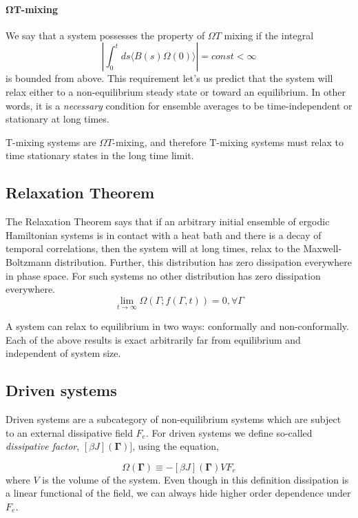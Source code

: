 \documentclass[a4paper,12pt,nofootinbib]{article}
\begin{document}
\paragraph{$\bm{\Omega T}$-mixing}
We say that a system possesses the property of $\Omega T$ mixing if the integral
\begin{equation}
    \left| \int_0^t ds \langle B(s) \Omega(0) \rangle \right| = const < \infty
\end{equation}
is bounded from above. This requirement let's us predict that the system will relax either to a non-equilibrium steady state or toward an equilibrium. In other words, it is a \textit{necessary} condition for ensemble averages to be time-independent or stationary at long times.

T-mixing systems are $\Omega T$-mixing, and therefore T-mixing systems must relax to time stationary states in the long time limit.


\subsection{Relaxation Theorem}
The Relaxation Theorem says that if an arbitrary initial ensemble of ergodic Hamiltonian systems is in contact with a heat bath and there is a decay of temporal correlations, then the system will at long times, relax to the Maxwell-Boltzmann distribution. Further, this distribution has zero dissipation everywhere in phase space. For such systems no other distribution has zero dissipation everywhere.
\begin{displaymath}
  \lim_{t\to \infty } \Omega (\Gamma ;f(\Gamma ,t))=0, \forall \Gamma
\end{displaymath}

A system can relax to equilibrium in two ways: conformally and non-conformally.
Each of the above results is exact arbitrarily far from equilibrium and independent of system size.

\subsection{Driven systems}

Driven systems are a subcategory of non-equilibrium systems which are subject to an external dissipative field $F_e$.
For driven systems we define so-called \textit{dissipative factor}, $[\beta J](\bm{\Gamma})]$, using the equation,

\begin{equation}
\label{primaryDissipationFunction}
  \Omega(\bm{\Gamma})\equiv -[\beta J](\bm{\Gamma})V F_e
\end{equation}
where $V$ is the volume of the system.
Even though in this definition dissipation is a linear functional of the field, we can always hide higher order dependence under $F_e$.
\end{document}
